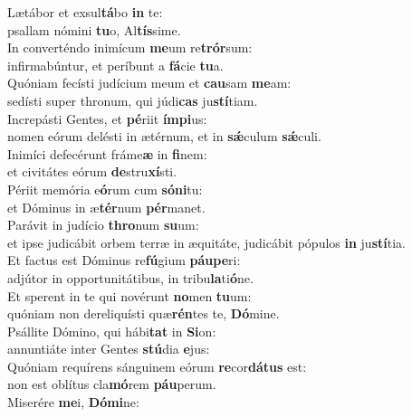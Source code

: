 \evenverse Lætábor et exsul\textbf{tá}bo \textbf{in} te:~\*\\
\evenverse psallam nómini \textbf{tu}o, Al\textbf{tís}sime.\\
\oddverse In converténdo inimícum \textbf{me}um re\textbf{trór}sum:~\*\\
\oddverse infirmabúntur, et períbunt a \textbf{fá}cie \textbf{tu}a.\\
\evenverse Quóniam fecísti judícium meum et \textbf{cau}sam \textbf{me}am:~\*\\
\evenverse sedísti super thronum, qui júdi\textbf{cas} ju\textbf{stí}tiam.\\
\oddverse Increpásti Gentes, et \textbf{pé}riit \textbf{ím}\textbf{pi}us:~\*\\
\oddverse nomen eórum delésti in ætérnum, et in \textbf{sǽ}culum \textbf{sǽ}culi.\\
\evenverse Inimíci defecérunt fráme\textbf{æ} in \textbf{fi}nem:~\*\\
\evenverse et civitátes eórum \textbf{de}stru\textbf{xí}sti.\\
\oddverse Périit memória e\textbf{ó}rum cum \textbf{só}\textbf{ni}tu:~\*\\
\oddverse et Dóminus in æ\textbf{tér}num \textbf{pér}manet.\\
\evenverse Parávit in judício \textbf{thro}num \textbf{su}um:~\*\\
\evenverse et ipse judicábit orbem terræ in æquitáte, judicábit pópulos \textbf{in} ju\textbf{stí}tia.\\
\oddverse Et factus est Dóminus re\textbf{fú}gium \textbf{páu}\textbf{pe}ri:~\*\\
\oddverse adjútor in opportunitátibus, in tribu\textbf{la}ti\textbf{ó}ne.\\
\evenverse Et sperent in te qui novérunt \textbf{no}men \textbf{tu}um:~\*\\
\evenverse quóniam non dereliquísti quæ\textbf{rén}tes te, \textbf{Dó}mine.\\
\oddverse Psállite Dómino, qui hábi\textbf{tat} in \textbf{Si}on:~\*\\
\oddverse annuntiáte inter Gentes \textbf{stú}dia \textbf{e}jus:\\
\evenverse Quóniam requírens sánguinem eórum \textbf{re}cor\textbf{dá}\textbf{tus} est:~\*\\
\evenverse non est oblítus cla\textbf{mó}rem \textbf{páu}perum.\\
\oddverse Miserére \textbf{me}i, \textbf{Dó}\textbf{mi}ne:~\*\\
